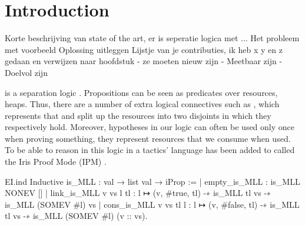 \documentclass[11pt,a4paper]{report}
\begin{document}


\tableofcontents

\chapter{Introduction}
\label{ch:introduction}
Korte beschrijving van state of the art, er is seperatie logica met ...
Het probleem met voorbeeld
Oplossing uitleggen
Lijstje van je contributies, ik heb x y en z gedaan en verwijzen naar hoofdstuk
- ze moeten nieuw zijn
- Meetbaar zijn
- Doelvol zijn

\iris is a separation logic \cite*{jungIrisMonoidsInvariants2015a,jungHigherorderGhostState2016,krebbersEssenceHigherOrderConcurrent2017,jungIrisGroundModular2018}. Propositions can be seen as predicates over resources, \eg heaps. Thus, there are a number of extra logical connectives such as , which represents that  and  split up the resources into two disjoints in which they respectively hold. Moreover, hypotheses in our logic can often be used only once when proving something, they represent resources that we consume when used. To be able to reason in this logic in \coq a tactics' language has been added to \coq called the Iris Proof Mode (IPM) \cite*{krebbersInteractiveProofsHigherorder2017,krebbersMoSeLGeneralExtensible2018}.

\begin{coqcode}
  EI.ind
  Inductive is_MLL : val → list val → iProp :=
    | empty_is_MLL : is_MLL NONEV []
    | link_is_MLL v vs l tl : l ↦ (v, #true, tl) -∗ 
      is_MLL tl vs -∗ is_MLL (SOMEV #l) vs
    | cons_is_MLL v vs tl l : l ↦ (v, #false, tl) -∗ 
      is_MLL tl vs -∗ is_MLL (SOMEV #l) (v :: vs).
\end{coqcode}





% 


\printbibliography

\newpage
\mbox{}
\thispagestyle{empty}
\newpage
\mbox{}
\thispagestyle{empty}
\end{document}
